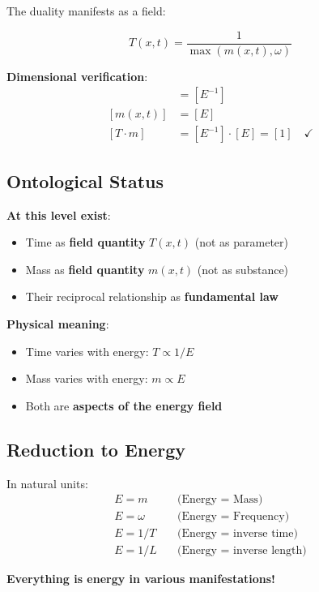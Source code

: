 	The duality manifests as a field:
	
	\begin{equation}
		\boxed{T(x,t) = \frac{1}{\max(m(x,t), \omega)}}
	\end{equation}
	
	\textbf{Dimensional verification}:
	\begin{align}
		[T(x,t)] &= [E^{-1}] \\
		[m(x,t)] &= [E] \\
		[T \cdot m] &= [E^{-1}] \cdot [E] = [1] \quad \checkmark
	\end{align}
	
	\subsection{Ontological Status}
	
	\textbf{At this level exist}:
	\begin{itemize}
		\item Time as \textbf{field quantity} $T(x,t)$ (not as parameter)
		\item Mass as \textbf{field quantity} $m(x,t)$ (not as substance)
		\item Their reciprocal relationship as \textbf{fundamental law}
	\end{itemize}
	
	\textbf{Physical meaning}:
	\begin{itemize}
		\item Time varies with energy: $T \propto 1/E$
		\item Mass varies with energy: $m \propto E$
		\item Both are \textbf{aspects of the energy field}
	\end{itemize}
	
	\subsection{Reduction to Energy}
	
	In natural units:
	\begin{align}
		E = m \quad &\text{(Energy = Mass)} \\
		E = \omega \quad &\text{(Energy = Frequency)} \\
		E = 1/T \quad &\text{(Energy = inverse time)} \\
		E = 1/L \quad &\text{(Energy = inverse length)}
	\end{align}
	
	\textbf{Everything is energy in various manifestations!}
	
